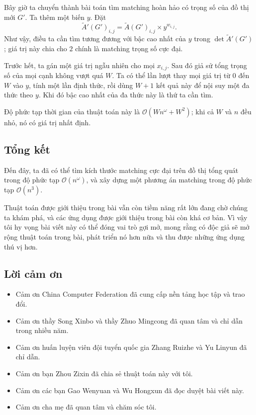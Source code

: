 \documentclass[11pt]{article}
\newcommand{\Oh}{\mathcal{O}}
\begin{document}
Bây giờ ta chuyển thành bài toán tìm matching hoàn hảo có trọng số của đồ thị
mới \(G'\). Ta thêm một biến \(y\). Đặt
\[
  \tilde A'(G')_{i,j}=\tilde A(G')_{i,j}\times y^{w_{i,j}}.
\]
Như vậy, điều ta cần tìm tương đương với bậc cao nhất của \(y\) trong
\(\det\tilde A'(G')\); giá trị này chia cho \(2\) chính là matching trọng số
cực đại.

Trước hết, ta gán một giá trị ngẫu nhiên cho mọi \(x_{i,j}\). Sau đó giả sử
tổng trọng số của mọi cạnh không vượt quá \(W\). Ta có thể lần lượt thay mọi
giá trị từ \(0\) đến \(W\) vào \(y\), tính một lần định thức, rồi dùng
\(W+1\) kết quả này để nội suy một đa thức theo \(y\). Khi đó bậc cao nhất của
đa thức này là thứ ta cần tìm.

Độ phức tạp thời gian của thuật toán này là \(\Oh(Wn^\omega+W^2)\); khi cả
\(W\) và \(n\) đều nhỏ, nó có giá trị nhất định.

\subsection{Tổng kết}

Đến đây, ta đã có thể tìm kích thước matching cực đại trên đồ thị tổng quát
trong độ phức tạp \(\Oh(n^\omega)\), và xây dựng một phương án matching trong
độ phức tạp \(\Oh(n^3)\).

Thuật toán được giới thiệu trong bài vẫn còn tiềm năng rất lớn đang chờ chúng
ta khám phá, và các ứng dụng được giới thiệu trong bài còn khá cơ bản. Vì vậy
tôi hy vọng bài viết này có thể đóng vai trò gợi mở, mong rằng có độc giả sẽ
mở rộng thuật toán trong bài, phát triển nó hơn nữa và thu được những ứng dụng
thú vị hơn.

\subsection*{Lời cảm ơn}

\begin{itemize}
  \item Cảm ơn China Computer Federation đã cung cấp nền tảng học tập và trao
  đổi.
  \item Cảm ơn thầy Song Xinbo và thầy Zhuo Mingcong đã quan tâm và chỉ dẫn
  trong nhiều năm.
  \item Cảm ơn huấn luyện viên đội tuyển quốc gia Zhang Ruizhe và Yu Linyun đã
  chỉ dẫn.
  \item Cảm ơn bạn Zhou Zixin đã chia sẻ thuật toán này với tôi.
  \item Cảm ơn các bạn Gao Wenyuan và Wu Hongxun đã đọc duyệt bài viết này.
  \item Cảm ơn cha mẹ đã quan tâm và chăm sóc tôi.
\end{itemize}
\end{document}
